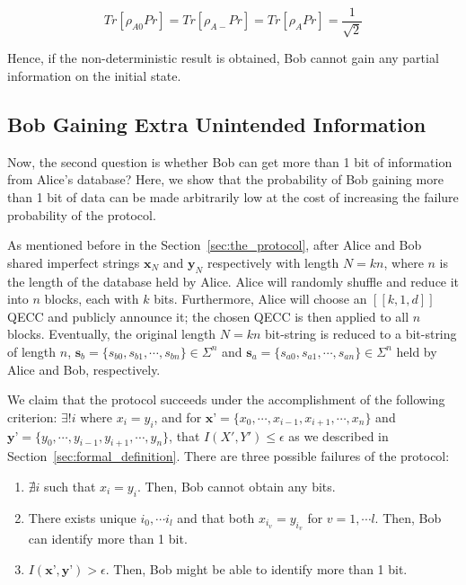 \documentclass[%
 reprint,
superscriptaddress,
 amsmath,amssymb,
 aps,
]{revtex4-2}
\begin{document}
\begin{equation}
    Tr[\rho_{A0}Pr]=Tr[\rho_{A-}Pr]=Tr[\rho_{A}Pr]=\frac{1}{\sqrt{2}}
\end{equation}

Hence, if the non-deterministic result is obtained, Bob cannot gain any partial information on the initial state.



\subsection{Bob Gaining Extra Unintended Information}
Now, the second question is whether Bob can get more than 1 bit of information from Alice's database? Here, we show that the probability of Bob gaining more than 1 bit of data can be made arbitrarily low at the cost of increasing the failure probability of the protocol.

As mentioned before in the Section~\ref{sec:the_protocol}, after Alice and Bob shared imperfect strings $\textbf{x}_N$ and $\textbf{y}_N$ respectively with length $N=kn$, where $n$ is the length of the database held by Alice. Alice will randomly shuffle and reduce it into $n$ blocks, each with $k$ bits. Furthermore, Alice will choose an $[[k, 1, d]]$ QECC and publicly announce it; the chosen QECC is then applied to all $n$ blocks. Eventually, the original length $N=kn$ bit-string is reduced to a bit-string of length $n$, $\textbf{s}_b=\{s_{b0}, s_{b1}, \cdots, s_{bn}\}\in\Sigma^n$ and $\textbf{s}_a=\{s_{a0}, s_{a1}, \cdots, s_{an}\}\in\Sigma^n$ held by Alice and Bob, respectively. 

We claim that the protocol succeeds under the accomplishment of the following criterion: $\exists! i$ where $x_i=y_i$, and for $\textbf{x'}=\{x_0, \cdots, x_{i-1}, x_{i+1}, \cdots, x_n\}$ and $\textbf{y'}=\{y_0, \cdots, y_{i-1}, y_{i+1}, \cdots, y_n\}$, that $I(X', Y')\le \epsilon$ as we described in Section~\ref{sec:formal_definition}. There are three possible failures of the protocol:
\begin{enumerate}
    \item $\nexists i$ such that $x_i=y_i$. Then, Bob cannot obtain any bits.

    \item There exists unique $i_0, \cdots i_l$ and that both $x_{i_v}=y_{i_v}$ for $v=1, \cdots l$. Then, Bob can identify more than 1 bit.

    \item $I(\textbf{x'}, \textbf{y'})>\epsilon$. Then, Bob might be able to identify more than 1 bit.
\end{enumerate}
\end{document}

